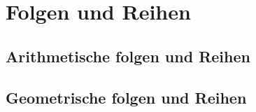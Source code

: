 \section{Folgen und Reihen}
\subsection{Arithmetische folgen und Reihen}
\subsection{Geometrische folgen und Reihen}